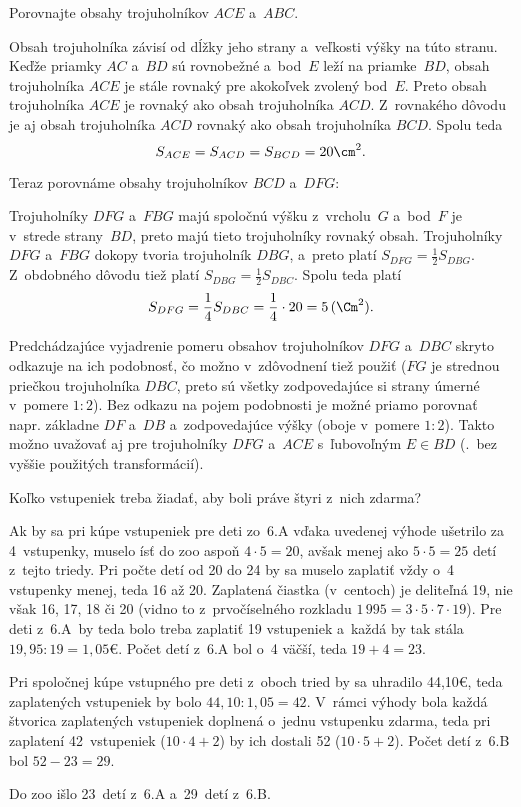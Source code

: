 {%
\napad
Porovnajte obsahy trojuholníkov $ACE$ a~$ABC$.

\riesenie
Obsah trojuholníka závisí od dĺžky jeho strany a~veľkosti výšky na túto stranu.
Keďže priamky $AC$ a~$BD$ sú rovnobežné a~bod~$E$ leží na priamke~$BD$, obsah
trojuholníka $ACE$ je stále rovnaký pre akokoľvek zvolený bod~$E$.
Preto obsah trojuholníka $ACE$ je rovnaký ako obsah trojuholníka $ACD$.
Z~rovnakého dôvodu je aj obsah trojuholníka $ACD$ rovnaký ako obsah trojuholníka $BCD$.
Spolu teda
$$
S_{ACE}=S_{ACD}=S_{BCD}=20\cm^2.
$$

Teraz porovnáme obsahy trojuholníkov $BCD$ a~$DFG$:
%


Trojuholníky $DFG$ a~$FBG$ majú spoločnú výšku z~vrcholu~$G$ a~bod~$F$ je
v~strede strany~$BD$, preto majú tieto trojuholníky rovnaký obsah.
Trojuholníky $DFG$ a~$FBG$ dokopy tvoria trojuholník $DBG$, a~preto platí
$
S_{DFG}=\frac12 S_{DBG}.
$
Z~obdobného dôvodu tiež platí
$
S_{DBG}=\frac12 S_{DBC}.
$
Spolu teda platí
$$
S_{DFG}=\frac14 S_{DBC}=\frac14\cdot 20=5\,(\Cm^2).
$$


\poznamka
Predchádzajúce vyjadrenie pomeru obsahov trojuholníkov $DFG$ a~$DBC$
skryto odkazuje na ich podobnosť, čo možno v~zdôvodnení tiež použiť ($FG$ je
strednou priečkou trojuholníka $DBC$, preto sú všetky zodpovedajúce si strany úmerné
v~pomere $1:2$).
Bez odkazu na pojem podobnosti je možné priamo porovnať napr. základne $DF$ a~$DB$
a~zodpovedajúce výšky (oboje v~pomere $1:2$).
Takto možno uvažovať aj pre trojuholníky $DFG$ a~$ACE$ s~ľubovoľným $E\in BD$
(\tj.~bez vyššie použitých transformácií).
}

{%
\napad
Koľko vstupeniek treba žiadať, aby boli práve štyri z~nich zdarma?

\riesenie
Ak by sa pri kúpe vstupeniek pre deti zo~6.A vďaka uvedenej výhode ušetrilo za 4~vstupenky, muselo ísť do zoo aspoň $4\cdot5=20$, avšak menej ako $5\cdot5=25$ detí z~tejto triedy.
Pri počte detí od 20 do 24 by sa muselo zaplatiť vždy o~4 vstupenky menej, teda 16 až 20.
Zaplatená čiastka (v~centoch) je deliteľná 19, nie však 16, 17, 18 či 20 (vidno to z~prvočíselného rozkladu $1\,995=3\cdot5\cdot7\cdot19$).
Pre deti z~6.A~by teda bolo treba zaplatiť 19 vstupeniek a~každá by tak stála $19{,}95:19=1{,}05$€.
Počet detí z~6.A bol o~4 väčší, teda $19+4=23$.

Pri spoločnej kúpe vstupného pre deti z~oboch tried by sa uhradilo 44{,}10€, teda zaplatených vstupeniek by bolo $44{,}10:1{,}05=42$.
V~rámci výhody bola každá štvorica zaplatených vstupeniek doplnená o~jednu vstupenku zdarma, teda pri zaplatení 42~vstupeniek ($10\cdot4+2$) by ich dostali 52 ($10\cdot5+2$).
Počet detí z~6.B bol $52-23=29$.

Do zoo išlo 23~detí z~6.A a~29~detí z~6.B.
}

